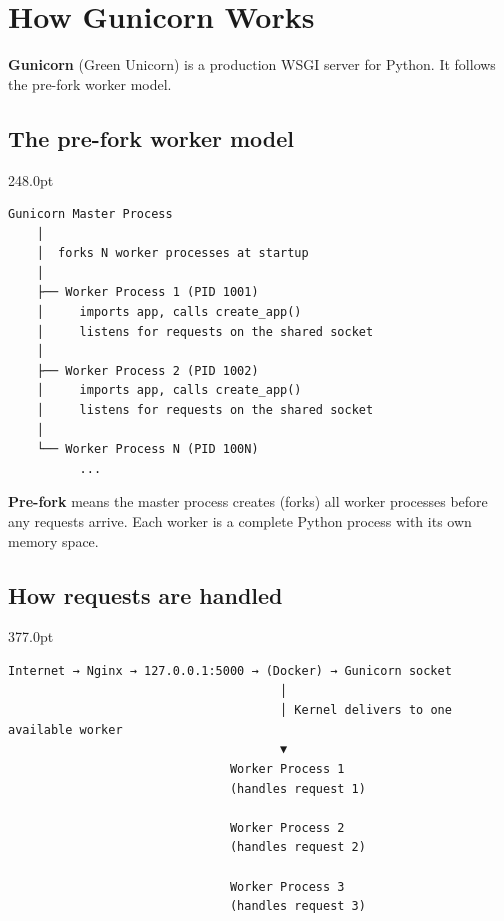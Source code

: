 \setcounter{section}{1}
\section{How Gunicorn Works}\label{24-process-startup:242-how-gunicorn-works}

\textbf{Gunicorn} (Green Unicorn) is a production WSGI server for Python. It follows the pre-fork worker model.

\subsection*{The pre-fork worker model}\label{24-process-startup:the-pre-fork-worker-model}

\begin{diagrambox}[short]{248.0pt}
\begin{Verbatim}[fontsize=\fontsize{9.0}{8.55}\selectfont]
Gunicorn Master Process
    │
    │  forks N worker processes at startup
    │
    ├── Worker Process 1 (PID 1001)
    │     imports app, calls create_app()
    │     listens for requests on the shared socket
    │
    ├── Worker Process 2 (PID 1002)
    │     imports app, calls create_app()
    │     listens for requests on the shared socket
    │
    └── Worker Process N (PID 100N)
          ...
\end{Verbatim}
\end{diagrambox}

\noindent{}\textbf{Pre-fork} means the master process creates (forks) all worker processes before any requests arrive. Each worker is a complete Python process with its own memory space.

\subsection*{How requests are handled}\label{24-process-startup:how-requests-are-handled}

\begin{diagrambox}[short]{377.0pt}
\begin{Verbatim}[fontsize=\fontsize{9.0}{8.55}\selectfont]
Internet → Nginx → 127.0.0.1:5000 → (Docker) → Gunicorn socket
                                      │
                                      │ Kernel delivers to one available worker
                                      ▼
                               Worker Process 1
                               (handles request 1)

                               Worker Process 2
                               (handles request 2)

                               Worker Process 3
                               (handles request 3)
\end{Verbatim}
\end{diagrambox}

